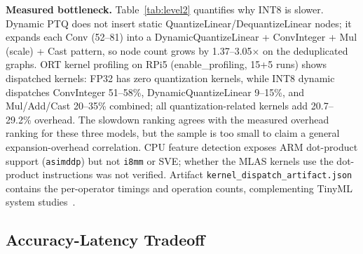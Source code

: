 \documentclass[conference,a4paper]{IEEEtran}
\begin{document}
\begin{table}[htbp]
\caption{Node expansion and executed-kernel dispatch on RPi5. Dynamic INT8 dispatches ConvInteger and quantization-related operators; FP32 has no quantization kernels. With three architectures, the measurements support the observed slowdown ranking but not a general expansion correlation.}
\label{tab:level2}
\centering
\footnotesize
\setlength{\tabcolsep}{3.0pt}
\end{table}

\textbf{Measured bottleneck.} Table~\ref{tab:level2} quantifies why INT8 is slower. Dynamic PTQ does not insert static QuantizeLinear/DequantizeLinear nodes; it expands each Conv (52--81) into a DynamicQuantizeLinear + ConvInteger + Mul (scale) + Cast pattern, so node count grows by 1.37--3.05$\times$ on the deduplicated graphs. ORT kernel profiling on RPi5 (enable\_profiling, 15+5 runs) shows dispatched kernels: FP32 has zero quantization kernels, while INT8 dynamic dispatches ConvInteger 51--58\%, DynamicQuantizeLinear 9--15\%, and Mul/Add/Cast 20--35\% combined; all quantization-related kernels add 20.7--29.2\% overhead. The slowdown ranking agrees with the measured overhead ranking for these three models, but the sample is too small to claim a general expansion-overhead correlation. CPU feature detection exposes ARM dot-product support (\texttt{asimddp}) but not \texttt{i8mm} or SVE; whether the MLAS kernels use the dot-product instructions was not verified. Artifact \texttt{kernel\_dispatch\_artifact.json} contains the per-operator timings and operation counts, complementing TinyML system studies~\cite{david2021}.

\subsection{Accuracy-Latency Tradeoff}
\label{sec:tradeoff}
\end{document}
